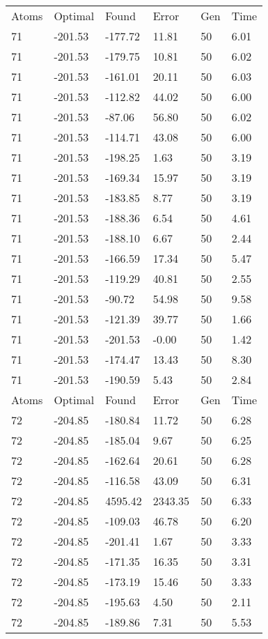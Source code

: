 \documentclass{report}
\begin{document}
\begin{appendix}
\begin{longtable}{llllll}
Atoms & Optimal & Found & Error & Gen & Time \\
71 & -201.53 & -177.72 & 11.81 & 50 & 6.01 \\
71 & -201.53 & -179.75 & 10.81 & 50 & 6.02 \\
71 & -201.53 & -161.01 & 20.11 & 50 & 6.03 \\
71 & -201.53 & -112.82 & 44.02 & 50 & 6.00 \\
71 & -201.53 & -87.06 & 56.80 & 50 & 6.02 \\
71 & -201.53 & -114.71 & 43.08 & 50 & 6.00 \\
71 & -201.53 & -198.25 & 1.63 & 50 & 3.19 \\
71 & -201.53 & -169.34 & 15.97 & 50 & 3.19 \\
71 & -201.53 & -183.85 & 8.77 & 50 & 3.19 \\
71 & -201.53 & -188.36 & 6.54 & 50 & 4.61 \\
71 & -201.53 & -188.10 & 6.67 & 50 & 2.44 \\
71 & -201.53 & -166.59 & 17.34 & 50 & 5.47 \\
71 & -201.53 & -119.29 & 40.81 & 50 & 2.55 \\
71 & -201.53 & -90.72 & 54.98 & 50 & 9.58 \\
71 & -201.53 & -121.39 & 39.77 & 50 & 1.66 \\
71 & -201.53 & -201.53 & -0.00 & 50 & 1.42 \\
71 & -201.53 & -174.47 & 13.43 & 50 & 8.30 \\
71 & -201.53 & -190.59 & 5.43 & 50 & 2.84 \\
Atoms & Optimal & Found & Error & Gen & Time \\
72 & -204.85 & -180.84 & 11.72 & 50 & 6.28 \\
72 & -204.85 & -185.04 & 9.67 & 50 & 6.25 \\
72 & -204.85 & -162.64 & 20.61 & 50 & 6.28 \\
72 & -204.85 & -116.58 & 43.09 & 50 & 6.31 \\
72 & -204.85 & 4595.42 & 2343.35 & 50 & 6.33 \\
72 & -204.85 & -109.03 & 46.78 & 50 & 6.20 \\
72 & -204.85 & -201.41 & 1.67 & 50 & 3.33 \\
72 & -204.85 & -171.35 & 16.35 & 50 & 3.31 \\
72 & -204.85 & -173.19 & 15.46 & 50 & 3.33 \\
72 & -204.85 & -195.63 & 4.50 & 50 & 2.11 \\
72 & -204.85 & -189.86 & 7.31 & 50 & 5.53 \\

\end{longtable}
\end{appendix}
\end{document}
